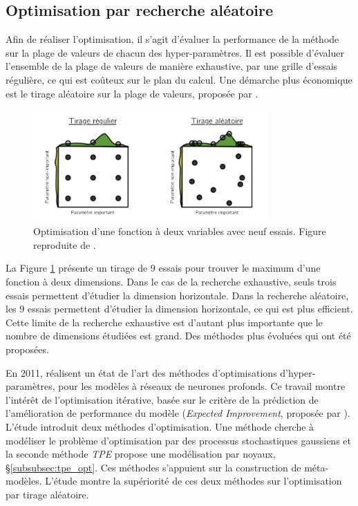 \subsection{Optimisation par recherche aléatoire} \label{subsec:random_search}
Afin de réaliser l'optimisation, il s'agit d'évaluer la performance de la méthode sur la plage de valeurs de chacun des hyper-paramètres.
Il est possible d'évaluer l'ensemble de la plage de valeurs de manière exhaustive, par une grille d'essais régulière, ce qui est coûteux sur le plan du calcul.
Une démarche plus économique est le tirage aléatoire sur la plage de valeurs, proposée par \citeauthor{bergstra_random_2012} \cite{bergstra_random_2012}.

\begin{figure}[hbtp]
    \centering
    \includegraphics[width=0.80\textwidth,height=\textheight,keepaspectratio]{../Chap4/Figures/bergstra_RandomSearch2002.png}
    \caption{Optimisation d'une fonction à deux variables avec neuf essais. Figure reproduite de \cite{bergstra_random_2012}.}
    \label{fig:random_search}
\end{figure}

La Figure \ref{fig:random_search} présente un tirage de 9 essais pour trouver le maximum d'une fonction à deux dimensions.
Dans le cas de la recherche exhaustive, seuls trois essais permettent d'étudier la dimension horizontale.
Dans la recherche aléatoire, les 9 essais permettent d'étudier la dimension horizontale, ce qui est plus efficient.
Cette limite de la recherche exhaustive est d'autant plus importante que le nombre de dimensions étudiées est grand.
Des méthodes plus évoluées qui ont été proposées.


En 2011, \citeauthor{bergstra_algorithms_2011} \cite{bergstra_algorithms_2011} réalisent un état de l'art des méthodes d'optimisations d'hyper-paramètres, pour les modèles à réseaux de neurones profonds.
Ce travail montre l'intérêt de l'optimisation itérative, basée sur le critère de la prédiction de l'amélioration de performance du modèle (\textit{Expected Improvement}, proposée par \citeauthor{jones_taxonomy_2001} \cite{jones_taxonomy_2001}).
L'étude introduit deux méthodes d'optimisation.
Une méthode cherche à modéliser le problème d'optimisation par des processus stochastiques gaussiens et la seconde méthode \textit{TPE} propose une modélisation par noyaux, §\ref{subsubsec:tpe_opt}.
Ces méthodes s'appuient sur la construction de méta-modèles.
L'étude montre la supériorité de ces deux méthodes sur l'optimisation par tirage aléatoire.

